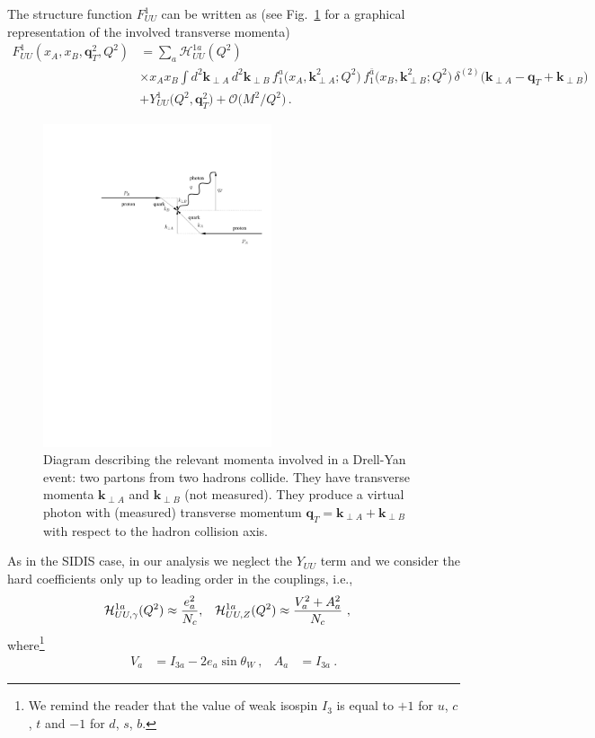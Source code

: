 \documentclass[aps,preprintnumbers,showpacs,nofootinbib,superscriptaddress,floatfix]{revtex4}
\newcommand{\T}{\perp}
\begin{document}
The structure function $F_{UU}^1$ can be written as (see Fig.~\ref{f:trans_momenta_DY} for a graphical
representation of the involved transverse momenta)
\begin{align}
\label{e:DYkT}
   F_{UU}^1(x_A,x_B, \bm{q}_{T}^2, Q^2) &= \sum_a \mathcal{H}_{UU}^{1 a}(Q^2) \\ 
      &\times x_A x_B \int d^2\bm{k}_{\T A}^{} \, d^2\bm{k}_{\T B}^{} 
\,  f_1^a\big(x_A,\bm{k}_{\T A}^2; Q^2 \big) 
\, f_{1}^{\bar{a}}\big(x_B,\bm{k}_{\T B}^2; Q^2 \big) \,
      \delta^{(2)} \big({\bm k}_{\T A} - {\bm q}_T + {\bm k}_{\T B}\big)
\nonumber\\&
\nonumber + Y_{UU}^1\big(Q^2, \bm{q}_T^2\big) + \mathcal{O}\big(M^2/Q^2\big) \, .
\end{align} 

\begin{figure}
\centering
\includegraphics[width=0.6\textwidth]{plots/trans_momenta_DY}
\caption{Diagram describing the relevant momenta involved in a Drell-Yan
  event: two partons from two hadrons collide. They have transverse momenta
  $\bm{k}_{\T A}$ and  $\bm{k}_{\T B}$ (not measured). They produce a virtual
  photon with (measured) transverse momentum $\bm{q}_T=\bm{k}_{\T A}+\bm{k}_{\T B} $ with respect to the hadron
  collision axis.}
\label{f:trans_momenta_DY}
\end{figure}

As in the SIDIS case, in our analysis we neglect the $Y_{UU}$ term
and we consider the hard coefficients only up to leading order in
the couplings, i.e.,
\begin{align} 
{\cal H}_{UU, \gamma}^{1 a}(Q^2) &\approx \frac{e_a^2}{N_c},
&
{\cal H}_{UU, Z}^{1 a}(Q^2) &\approx \frac{V_a^2+A_a^2}{N_c} \ ,
\end{align}  
where\footnote{We remind the reader that the value of weak isospin $I_3$ is equal to $+1$ for $u$, $c$, $t$ and
  $-1$ for $d$, $s$, $b$.}
\begin{align}
V_a & = I_{3a} - 2 e_{a} \sin \theta_W \  ,
&
A_a & = I_{3a} \  .
\end{align} 
\end{document}
